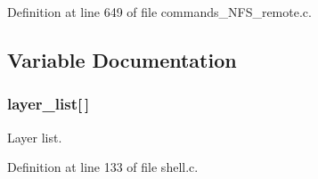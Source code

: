 Definition at line 649 of file commands\_\-NFS\_\-remote.c.

\subsection{Variable Documentation}
\subsubsection[{layer\_\-list}]{ {\bf layer\_\-list}[$\,$]}\label{commands_8h_ae751cf5f3c0928b64ffd28ab9b1fe17d}
Layer list. 

Definition at line 133 of file shell.c.